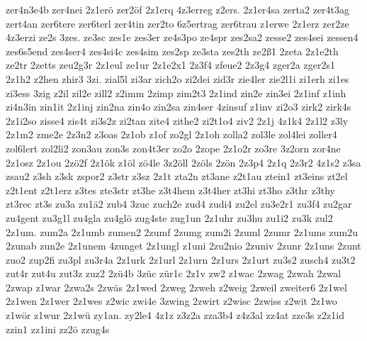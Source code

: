{zer4n3e4b
zer4nei
2z1erö
zer2öf
2z1erq
4z3erreg
z2ers.
2z1er4sa
zerta2
zer4t3ag
zert4an
zer6tere
zer6terl
zer4tin
zer2to
6z5ertrag
zer6trau
z1erwe
2z1erz
zer2ze
4z3erzi
ze2s
3zes.
ze3sc
zes1e
zes3er
ze4s3po
ze4spr
zes2sa2
zesse2
zes4sei
zessen4
zes6s5end
zes4ser4
zes4si4c
zes4sim
zes2sp
ze3sta
zes2th
ze2ß1
2zeta
2z1e2th
ze2tr
2zetts
zeu2g3r
2z1eul
ze1ur
2z1e2x1
2z3f4
zfeue2
2z3g4
zger2a
zger2s1
2z1h2
z2hen
zhir3
3zi.
zial5l
zi3ar
zich2o
zi2dei
zid3r
zie4ler
zie2l1i
zi1erh
zi1es
zi3ess
3zig
z2il
zil2e
zill2
z2imm
2zimp
zim2t3
2z1ind
zin2e
zin3ei
2z1inf
z1inh
zi4n3in
zin1it
2z1inj
zin2na
zin4o
zin2sa
zin4ser
4zinsuf
z1inv
zi2o3
zirk2
zirk4s
2z1i2so
zisse4
zis4t
zi3s2z
zi2tan
zite4
zithe2
zi2t1o4
ziv2
2z1j
4z1k4
2z1l2
z3ly
2z1m2
zme2e
2z3n2
z3oas
2z1ob
z1of
zo2gl
2z1oh
zolla2
zol3le
zol4lei
zoller4
zol6lert
zol2li2
zon3au
zon3s
zon4t3er
zo2o
2zope
2z1o2r
zo3re
3z2orn
zor4ne
2z1osz
2z1ou
2zö2f
2z1ök
z1öl
zö4le
3z2öll
2zöls
2zön
2z3p4
2z1q
2z3r2
4z1s2
z3sa
zsau2
z3sh
z3sk
zspor2
z3str
z3sz
2z1t
zta2n
zt3ane
z2t1au
ztein1
zt3eins
zt2el
z2t1ent
z2t1erz
z3tes
zte3str
zt3he
z3t4hem
z3t4her
zt3hi
zt3ho
z3thr
z3thy
zt3rec
zt3s
zu3a
zu1ä2
zub4
3zuc
zuch2e
zud4
zudi4
zu2el
zu3e2r1
zu3f4
zu2gar
zu4gent
zu3g1l
zu4gla
zu4glö
zug4ste
zug1un
2z1uhr
zu3hu
zu1i2
zu3k
zul2
2z1um.
zum2a
2z1umb
zumen2
2zumf
2zumg
zum2i
2zuml
2zumr
2z1ums
zum2u
2zunab
zun2e
2z1unem
4zunget
2z1ungl
z1uni
2zu2nio
2zuniv
2zunr
2z1uns
2zunt
zuo2
zup2fi
zu3pl
zu3r4a
2z1urk
2z1url
2z1urn
2z1urs
2z1urt
zu3s2
zusch4
zu3t2
zut4r
zut4u
zut3z
zuz2
2zü4b
3züc
zür1c
2z1v
zw2
z1wac
2zwag
2zwah
2zwal
2zwap
z1war
2zwa2s
2zwäs
2z1wed
2zweg
2zweh
z2weig
2zweil
zweiter6
2z1wel
2z1wen
2z1wer
2z1wes
z2wic
zwi4e
3zwing
2zwirt
z2wisc
2zwiss
z2wit
2z1wo
z1wör
z1wur
2z1wü
zy1an.
zy2le4
4z1z
z3z2a
zza3b4
z4z3al
zz4at
zze3s
z2z1id
zzin1
zz1ini
zz2ö
zzug4s
}

\endinput

